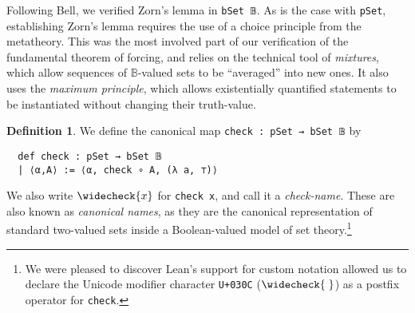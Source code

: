 \documentclass[sigplan,10pt,review, autoref,anonymous]{acmart}
\newcommand{\B}{\mathbb{B}}
\newcommand{\lil}{\lstinline}
\theoremstyle{definition}
\newtheorem{defn}{Definition}[section]
\begin{document}



Following Bell, we verified Zorn's lemma in \lil{bSet 𝔹}.
As is the case with \lil{pSet}, establishing Zorn's lemma requires the use of a choice principle from the metatheory.
This was the most involved part of our verification of the fundamental theorem of forcing, and relies on the technical tool of \emph{mixtures}, which allow sequences of $\B$-valued sets to be ``averaged'' into new ones.
It also uses the \emph{maximum principle}, which allows existentially quantified statements to be instantiated without changing their truth-value. %


\begin{defn}\label{def-check}
  We define the canonical map \lil{check : pSet → bSet 𝔹} by
  \begin{lstlisting}
  def check : pSet → bSet 𝔹
  | ⟨α,A⟩ := ⟨α, check ∘ A, (λ a, ⊤)⟩
  \end{lstlisting}
  We also write $\widecheck{x}$ for \lil{check x}, and call it a \emph{check-name}.
  These are also known as \emph{canonical names}, as they are the canonical representation of standard two-valued sets inside a Boolean-valued model of set theory.\footnote{We were pleased to discover Lean's support for custom notation allowed us to declare the Unicode modifier character \texttt{U+030C} ($\widecheck{\hspace{1mm}}$) as a postfix operator for \texttt{check}.}
\end{defn}
\end{document}

